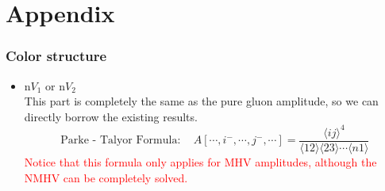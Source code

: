 \documentclass{beamer}
\newcommand{\avg}[1]{\langle #1 \rangle}
\begin{document}
\appendix
\section{Appendix}
\begin{frame}
    \frametitle{Color structure}
    \begin{itemize}
        \item n$ V_1$ or n$V_2$\\
        This part is completely the same as the pure gluon amplitude, so we can directly borrow the
        existing results.
        \begin{equation*}
            \boxed{\text{Parke - Talyor Formula}:\quad A[\cdots,i^-,\cdots,j^-,\cdots]=\frac{\avg{ij}^4}{\avg{12}\!\avg{23}\cdots\avg{n1}}}
        \end{equation*}
        \textcolor{red}{Notice that this formula only applies for MHV amplitudes, although the NMHV can be completely solved.}
    \end{itemize}
\end{frame}
\end{document}
